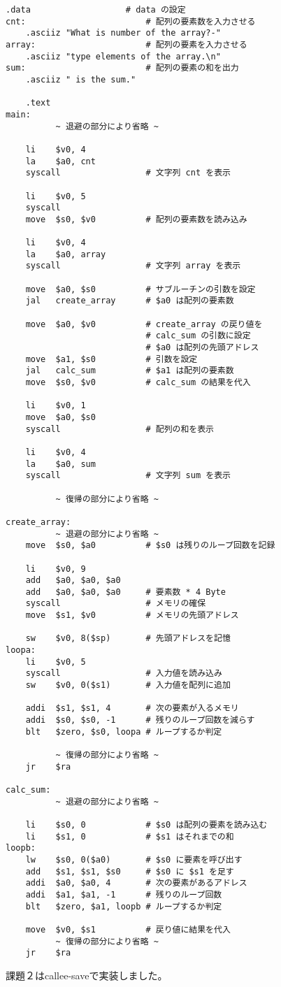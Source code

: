 \documentclass{jarticle}
\begin{document}
    \begin{lstlisting}[caption=assignment2.s]
    .data                   # data の設定
cnt:                        # 配列の要素数を入力させる
    .asciiz "What is number of the array?-"
array:                      # 配列の要素を入力させる
    .asciiz "type elements of the array.\n"
sum:                        # 配列の要素の和を出力
    .asciiz " is the sum."

    .text
main:
          ~ 退避の部分により省略 ~

    li    $v0, 4
    la    $a0, cnt
    syscall                 # 文字列 cnt を表示

    li    $v0, 5
    syscall
    move  $s0, $v0          # 配列の要素数を読み込み

    li    $v0, 4
    la    $a0, array
    syscall                 # 文字列 array を表示

    move  $a0, $s0          # サブルーチンの引数を設定
    jal   create_array      # $a0 は配列の要素数

    move  $a0, $v0          # create_array の戻り値を
                            # calc_sum の引数に設定
                            # $a0 は配列の先頭アドレス
    move  $a1, $s0          # 引数を設定
    jal   calc_sum          # $a1 は配列の要素数
    move  $s0, $v0          # calc_sum の結果を代入

    li    $v0, 1
    move  $a0, $s0
    syscall                 # 配列の和を表示

    li    $v0, 4
    la    $a0, sum
    syscall                 # 文字列 sum を表示

          ~ 復帰の部分により省略 ~

create_array:
          ~ 退避の部分により省略 ~
    move  $s0, $a0          # $s0 は残りのループ回数を記録

    li    $v0, 9
    add   $a0, $a0, $a0
    add   $a0, $a0, $a0     # 要素数 * 4 Byte
    syscall                 # メモリの確保
    move  $s1, $v0          # メモリの先頭アドレス

    sw    $v0, 8($sp)       # 先頭アドレスを記憶
loopa:
    li    $v0, 5
    syscall                 # 入力値を読み込み
    sw    $v0, 0($s1)       # 入力値を配列に追加

    addi  $s1, $s1, 4       # 次の要素が入るメモリ
    addi  $s0, $s0, -1      # 残りのループ回数を減らす
    blt   $zero, $s0, loopa # ループするか判定

          ~ 復帰の部分により省略 ~
    jr    $ra

calc_sum:
          ~ 退避の部分により省略 ~

    li    $s0, 0            # $s0 は配列の要素を読み込む
    li    $s1, 0            # $s1 はそれまでの和
loopb:
    lw    $s0, 0($a0)       # $s0 に要素を呼び出す
    add   $s1, $s1, $s0     # $s0 に $s1 を足す
    addi  $a0, $a0, 4       # 次の要素があるアドレス
    addi  $a1, $a1, -1      # 残りのループ回数
    blt   $zero, $a1, loopb # ループするか判定

    move  $v0, $s1          # 戻り値に結果を代入
          ~ 復帰の部分により省略 ~
    jr    $ra
    \end{lstlisting}
    課題２はcallee-saveで実装しました。
\end{document}
